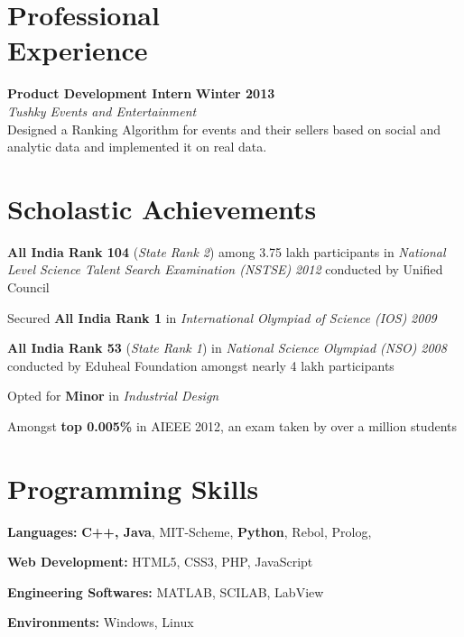 \documentclass[margin,11pt]{resume}
\begin{document}
\begin{resume}
\pagebreak

\vspace{-150em}

\section{\mysidestyle Professional \\ Experience}
\textbf{Product Development Intern} \hfill \textbf{Winter 2013}\\
\textsl{Tushky Events and Entertainment}\\
Designed a Ranking Algorithm for events and their sellers based on social and analytic data and implemented it on real data.

\section{\mysidestyle Scholastic Achievements}
\begin{list2}
\item \textbf{All India Rank 104} (\textsl{State Rank 2}) among 3.75 lakh participants in \textsl{National Level Science Talent Search Examination (NSTSE)} \textsl{2012} conducted by Unified Council
\item Secured \textbf{All India Rank 1} in \textsl{International Olympiad of Science (IOS)} \textsl{2009}
\item \textbf{All India Rank 53} (\textsl{State Rank 1}) in \textsl{National Science Olympiad (NSO)} \textsl{2008} conducted by Eduheal Foundation amongst nearly 4 lakh participants
\item Opted for \textbf{Minor} in \textsl{Industrial Design}
\item Amongst \textbf{top 0.005\%} in AIEEE 2012, an exam taken by over a million students
 \end{list2}
 
\section{\mysidestyle Programming Skills}
\begin{list2}
\item \textbf{Languages:} \textbf{C++, Java}, MIT-Scheme, \textbf{Python}, Rebol, Prolog, \LaTeXe{}
\item \textbf{Web Development:} HTML5, CSS3, PHP, JavaScript
\item \textbf{Engineering Softwares:} MATLAB, SCILAB, LabView
\item \textbf{Environments:} Windows, Linux
\end{list2}


\end{resume}
\end{document}
